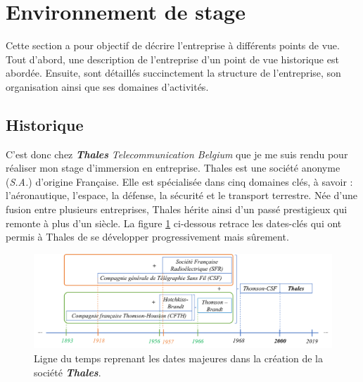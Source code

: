 \documentclass[10pt, oneside, a4paper]{article}
\begin{document}


\newpage




\newpage

\section{Environnement de stage}
Cette section a pour objectif de décrire l'entreprise à différents points de vue. Tout d'abord, une description de l'entreprise d'un point de vue historique est abordée. Ensuite, sont détaillés succinctement la structure de l'entreprise, son organisation ainsi que ses domaines d'activités.

\subsection{Historique}
C'est donc chez \textbf{\textit{Thales}} \textit{Telecommunication Belgium} que je me suis rendu pour réaliser mon stage d'immersion en entreprise. Thales est une société anonyme (\textit{S.A.}) d'origine Française. Elle est spécialisée dans cinq domaines clés, à savoir : l'aéronautique, l'espace, la défense, la sécurité et le transport terrestre. Née d'une fusion entre plusieurs entreprises, Thales hérite ainsi d’un passé prestigieux qui remonte à plus d’un siècle. La figure \ref{fig:temps} ci-dessous retrace les dates-clés qui ont permis à Thales de se développer progressivement mais sûrement. \\

\begin{figure}[htbp]
    \centering
    \includegraphics[width=1.\textwidth]{image/temps}
    \caption{Ligne du temps reprenant les dates majeures dans la création de la société \textbf{\textit{Thales}}.}
    \label{fig:temps}
\end{figure}
\end{document}
